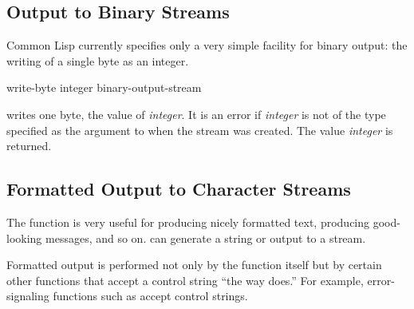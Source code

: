 \subsection {Output to Binary Streams}

Common Lisp currently specifies only a very simple facility for binary output:
the writing of a single byte as an integer.

\begin{defun}[Function]
write-byte integer binary-output-stream

 writes one byte, the value of {\it integer}.
It is an error if {\it integer} is not of the type
specified as the  argument to  when the stream
was created.
The value {\it integer} is returned.
\end{defun}


\subsection{Formatted Output to Character Streams}
\label{FORMAT-SECTION}

The function  is very useful for producing
nicely formatted text, producing good-looking messages, and so on.
 can generate a string or output to a stream.

Formatted output is performed not only by the  function
itself but by certain other functions that accept a control string
``the way  does.''  For example, error-signaling functions
such as  accept  control strings.

